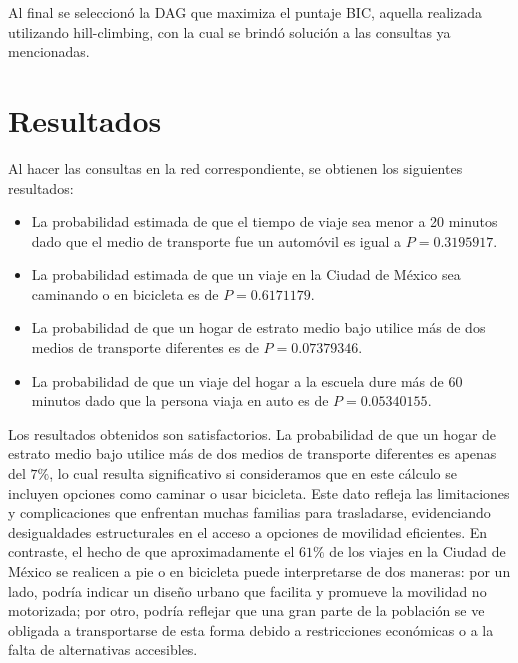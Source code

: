 \documentclass[eng]{ajceam-class}
\begin{document}
Al final se seleccionó la DAG que maximiza el puntaje BIC, aquella realizada utilizando hill-climbing, con la cual se brindó solución a las consultas ya mencionadas.

\section{Resultados}
Al hacer las consultas en la red correspondiente, se obtienen los siguientes resultados:

\begin{itemize}
    \item La probabilidad estimada de que el tiempo de viaje sea menor a 20 minutos dado que el medio de transporte fue un automóvil es igual a $P=0.3195917$.
    
    \item  La probabilidad estimada de que un viaje en la Ciudad de México sea caminando o en bicicleta es de $P=0.6171179$.
    
    \item La probabilidad de que un hogar de estrato medio bajo utilice más de dos medios de transporte diferentes es de $P=0.07379346$.

    \item La probabilidad de que un viaje del hogar a la escuela dure más de 60 minutos dado que la persona viaja en auto es de $P=0.05340155$.
    
\end{itemize}

Los resultados obtenidos son satisfactorios. La probabilidad de que un hogar de estrato medio bajo utilice más de dos medios de transporte diferentes es apenas del $7\%$, lo cual resulta significativo si consideramos que en este cálculo se incluyen opciones como caminar o usar bicicleta. Este dato refleja las limitaciones y complicaciones que enfrentan muchas familias para trasladarse, evidenciando desigualdades estructurales en el acceso a opciones de movilidad eficientes. En contraste, el hecho de que aproximadamente el $61\%$ de los viajes en la Ciudad de México se realicen a pie o en bicicleta puede interpretarse de dos maneras: por un lado, podría indicar un diseño urbano que facilita y promueve la movilidad no motorizada; por otro, podría reflejar que una gran parte de la población se ve obligada a transportarse de esta forma debido a restricciones económicas o a la falta de alternativas accesibles.
\end{document}
